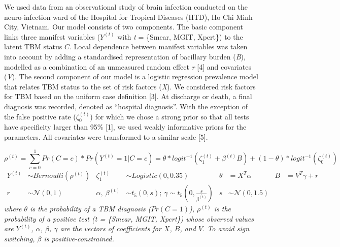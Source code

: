 \documentclass[
]{article}
\begin{document}
We used data from an observational study of brain infection conducted on the neuro-infection ward of the Hospital for Tropical Diseases (HTD), Ho Chi Minh City, Vietnam. Our model consists of two components. The basic component links three manifest variables (\(Y^{(t)}\) with \emph{t} = \{Smear, MGIT, Xpert\}) to the latent TBM status \(C\). Local dependence between manifest variables was taken into account by adding a standardised representation of bacillary burden (\emph{B}), modelled as a combination of an unmeasured random effect \emph{r} {[}4{]} and covariates (\emph{V}). The second component of our model is a logistic regression prevalence model that relates TBM status to the set of risk factors (\emph{X}). We considered risk factors for TBM based on the uniform case definition {[}3{]}. At discharge or death, a final diagnosis was recorded, denoted as ``hospital diagnosis''. With the exception of the false positive rate (\(\zeta^{(t)}_0\)) for which we chose a strong prior so that all tests have specificity larger than 95\% {[}1{]}, we used weakly informative priors for the parameters. All covariates were transformed to a similar scale {[}5{]}.

\[
\]
\[
\rho^{(t)} 
=\sum_{c=0}^1Pr(C=c) * Pr(Y^{(t)}=1|C=c)
= \theta * logit^{-1}(\zeta_1^{(t)} + \beta^{(t)}B) + (1 - \theta) * logit^{-1}(\zeta_0^{(t)})
\]
\[
\begin{aligned}
Y^{(t)} &\sim Bernoulli(\rho^{(t)})
&\zeta^{(t)}_1 &\sim Logistic(0,0.35) 
&\theta &= X^T \alpha &B &= V^T \gamma + r \\
r &\sim \mathcal{N}(0, 1) 
&{\alpha,\ \beta^{(t)}} &\sim t_5(0, s);\ \gamma \sim t_5(0, \frac{s}{\overline{\beta^{(t)}}})
&s &\sim \mathcal{N}(0, 1.5)
\end{aligned}
\]
\emph{where \(\theta\) is the probability of a TBM diagnosis (\(Pr(C=1)\)), \(\rho^{(t)}\) is the probability of a positive test (t = \{Smear, MGIT, Xpert\}) whose observed values are \(Y^{(t)}\), \(\alpha\), \(\beta\), \(\gamma\) are the vectors of coefficients for \(X\), \(B\), and \(V\). To avoid sign switching, \(\beta\) is positive-constrained. }
\end{document}
